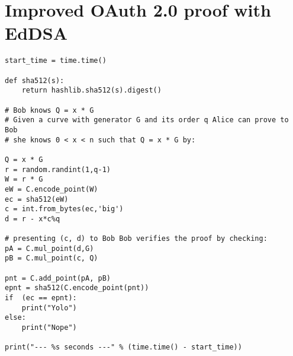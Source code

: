 \section*{Improved OAuth 2.0 proof with EdDSA}

\begin{lstlisting}
start_time = time.time()

def sha512(s):
    return hashlib.sha512(s).digest()
    
# Bob knows Q = x * G
# Given a curve with generator G and its order q Alice can prove to Bob
# she knows 0 < x < n such that Q = x * G by: 

Q = x * G
r = random.randint(1,q-1) 
W = r * G
eW = C.encode_point(W)
ec = sha512(eW)
c = int.from_bytes(ec,'big')
d = r - x*c%q 

# presenting (c, d) to Bob Bob verifies the proof by checking:
pA = C.mul_point(d,G)
pB = C.mul_point(c, Q)

pnt = C.add_point(pA, pB)
epnt = sha512(C.encode_point(pnt))
if  (ec == epnt):
    print("Yolo")
else:
    print("Nope")
    
print("--- %s seconds ---" % (time.time() - start_time))

\end{lstlisting}